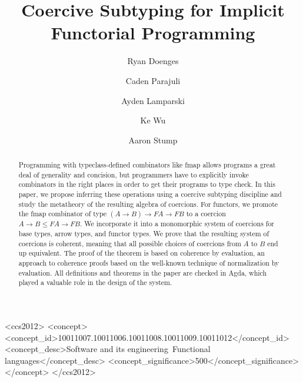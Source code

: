 \documentclass[acmsmall,screen]{acmart}
\begin{document}
\title{Coercive Subtyping for Implicit Functorial Programming}

\author{Ryan Doenges}
{}

\author{Caden Parajuli}

\author{Ayden Lamparski}

\author{Ke Wu}

\author{Aaron Stump}


\renewcommand{\shortauthors}{Doenges~et~al.}

\begin{CCSXML}
<ccs2012>
<concept>
<concept_id>10011007.10011006.10011008.10011009.10011012</concept_id>
<concept_desc>Software and its engineering~Functional languages</concept_desc>
<concept_significance>500</concept_significance>
</concept>
</ccs2012>
\end{CCSXML}


\begin{abstract}
Programming with typeclass-defined combinators like fmap allows programs a great deal of generality and concision, but programmers have to explicitly invoke combinators in the right places in order to get their programs to type check. In this paper, we propose inferring these operations using a coercive subtyping discipline and study the metatheory of the resulting algebra of coercions. For functors, we promote the fmap combinator of type $(A \to B) \to F A \to F B$ to a coercion $A \to B \leq F A \to F B$. We incorporate it into a monomorphic system of coercions for base types, arrow types, and functor types. We prove that the resulting system of coercions is coherent, meaning that all possible choices of coercions from $A$ to $B$ end up equivalent. The proof of the theorem is based on coherence by evaluation, an approach to coherence proofs based on the well-known technique of normalization by evaluation.  All definitions and theorems in the paper are checked in Agda, which played a valuable role in the design of the system.
\end{abstract}
\end{document}

